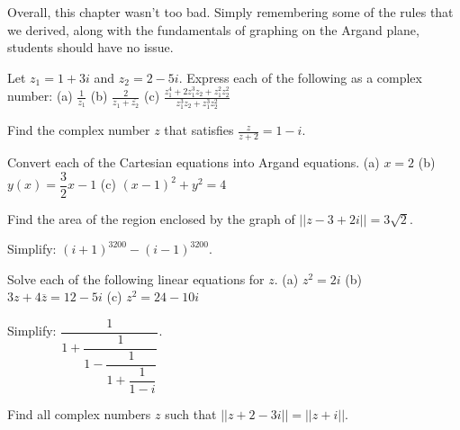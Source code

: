 \documentclass[lang=en,11pt]{elegantbook}
\begin{document}
\noindent Overall, this chapter wasn't too bad.  Simply remembering some of the rules that we derived, along with the fundamentals of graphing on the Argand plane, students should have no issue.  \vspace{3mm}
\begin{reviewset}
\item Let $z_1=1+3i$ and $z_2=2-5i$.  Express each of the following as a complex number: \newline
{\centering (a) $\displaystyle \frac{1}{z_1}$ \hspace{1in} (b) $\displaystyle \frac{2}{z_1+\overline{z_2}}$ \hspace{1in} (c) $\displaystyle \frac{z_1^4+2z_1^3z_2+z_1^2z_2^2}{z_1^3z_2+z_1^3z_2^2}$}\vspace{3mm}

\item Find the complex number $z$ that satisfies $\displaystyle \frac{z}{z+2}=1-i$.  \vspace{3mm}

\item Convert each of the Cartesian equations into Argand equations.  \newline
(a) $x=2$ \newline
(b) $y(x)=\dfrac{3}{2}x-1$ \newline 
(c) $(x-1)^2+y^2=4$ \vspace{3mm} 

\item Find the area of the region enclosed by the graph of $||z-3+2i||=3\sqrt{2}$.\vspace{3mm}

\item Simplify: $\displaystyle (i+1)^{3200}-(i-1)^{3200}$.\vspace{3mm}

\item Solve each of the following linear equations for $z$.  \newline 
(a) $z^2=2i$ \newline 
(b) $3z+4\overline{z}=12-5i$ \newline 
(c) $z^2=24-10i$ \vspace{3mm}

\item Simplify: $\dfrac{1}{1+\dfrac{1}{1-\dfrac{1}{1+\dfrac{1}{1-i}}}}$.\vspace{3mm}

\item Find all complex numbers $z$ such that $||z+2-3i||=||z+i||$.\vspace{3mm}


\end{reviewset}
\end{document}
